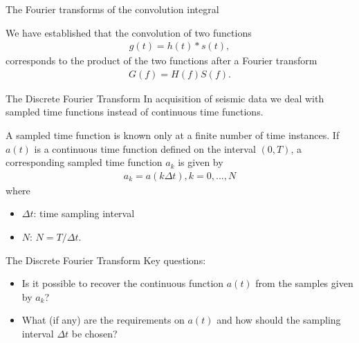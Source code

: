 \documentclass[xcolor=dvipsnames,notes]{beamer}
\begin{document}
\begin{frame}{The Fourier transforms of the convolution integral}

We have established that the convolution of two functions 
%
\begin{eqnarray}
  g(t)=h(t)*s(t),
   \label{eq:3-12} 
\end{eqnarray}
%
corresponds to the product of the two functions after a Fourier
transform
%
\begin{eqnarray}
  G(f)=H(f)S(f).
   \label{eq:3-13} 
\end{eqnarray}
\end{frame}
\begin{frame}{The Discrete Fourier Transform}
In acquisition of seismic data we deal with sampled 
time functions instead of continuous time functions.

A sampled time function is known only at a finite number
of time instances. If $a(t)$ is a continuous time function
defined on the interval $(0,T)$, a corresponding sampled time function $a_k$ is given by
%
\begin{eqnarray}
  a_k = a(k\Delta t), k=0,...,N
    \label{eq:2-17}
\end{eqnarray}
where 
\begin{itemize}
\item $\Delta t$: time sampling interval 
\item $N$:  $N=T/\Delta t $.
\end{itemize}
\end{frame}
\begin{frame}{The Discrete Fourier Transform}
Key questions: 
\begin{itemize}
\item Is it possible to
recover the continuous function $a(t)$ from the samples given by $a_k$? 
\item
What (if any) are the requirements on $a(t)$ and how should the sampling interval
$\Delta t$ be chosen?
\end{itemize}
\end{frame}
\end{document}
